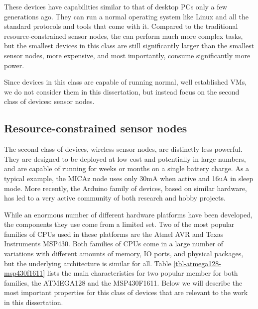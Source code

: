 These devices have capabilities similar to that of desktop PCs only a few generations ago. They can run a normal operating system like Linux and all the standard protocols and tools that come with it. Compared to the traditional resource-constrained sensor nodes, the can perform much more complex tasks, but the smallest devices in this class are still significantly larger than the smallest sensor nodes, more expensive, and most importantly, consume significantly more power.

Since devices in this class are capable of running normal, well established VMs, we do not consider them in this dissertation, but instead focus on the second class of devices: sensor nodes.

\subsection{Resource-constrained sensor nodes}
The second class of devices, wireless sensor nodes, are distinctly less powerful. They are designed to be deployed at low cost and potentially in large numbers, and are capable of running for weeks or months on a single battery charge. As a typical example, the MICAz node \cite{CrossbowTechnology} uses only 30mA when active and 16uA in sleep mode. More recently, the Arduino family of devices, based on similar hardware, has led to a very active community of both research and hobby projects.

While an enormous number of different hardware platforms have been developed, the components they use come from a limited set. Two of the most popular families of CPUs used in these platforms are the Atmel AVR and Texas Instruments MSP430. Both families of CPUs come in a large number of variations with different amounts of memory, IO ports, and physical packages, but the underlying architecture is similar for all. Table \ref{tbl-atmega128-msp430f1611} lists the main characteristics for two popular member for both families, the ATMEGA128 and the MSP430F1611. Below we will describe the most important properties for this class of devices that are relevant to the work in this dissertation.

